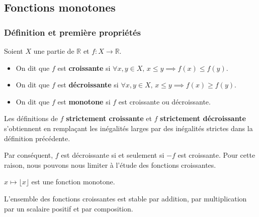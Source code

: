 




  \subsection{Fonctions monotones}

  \subsubsection{Définition et première propriétés}


  \begin{definition}
    Soient $X$ une partie de $\mathbb{R}$ et $f : X \rightarrow \mathbb{R}$.
    \begin{itemize}
      \item On dit que $f$ est \textbf{croissante} si $\forall x, y \in X, \, x \leq y \implies f(x) \leq f(y)$.
      \item On dit que $f$ est \textbf{décroissante} si $\forall x, y \in X, \, x \leq y \implies f(x) \geq f(y)$.
      \item On dit que $f$ est \textbf{monotone} si $f$ est croissante ou décroissante.
    \end{itemize}
  \end{definition}

  \begin{remark}
    Les définitions de $f$ \textbf{strictement croissante} et $f$ \textbf{strictement décroissante} s'obtiennent en remplaçant les inégalités larges par des inégalités strictes dans la définition précédente.
  \end{remark}

  Par conséquent, $f$ est décroissante si et seulement si $-f$ est croissante. Pour cette raison, nous pouvons nous limiter à l'étude des fonctions croissantes.

  \begin{example}
    $x \mapsto \lfloor x \rfloor$ est une fonction monotone.
  \end{example}


  \begin{proposition}
    L'ensemble des fonctions croissantes est stable par addition, par multiplication par un scalaire positif et par composition.
  \end{proposition}

